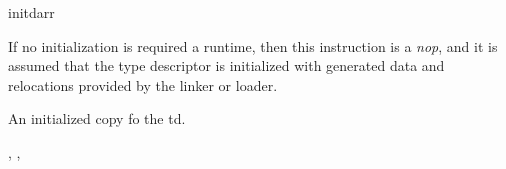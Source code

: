 \begin{instruction}{initdarr}

  \begin{notes}
    If no initialization is required a runtime, then this instruction
    is a \emph{nop}, and it is assumed that the type descriptor is
    initialized with generated data and relocations provided by the
    linker or loader.
  \end{notes}

  \begin{results}
  \item An initialized copy fo the \ac{td}.
  \end{results}

  \begin{operands}
  \item {}
  \end{operands}
  \begin{seealso}
    , ,
  \end{seealso}
\end{instruction}
